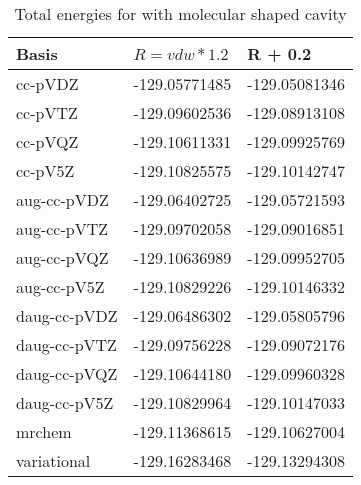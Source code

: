 \documentclass[../master_thesis.tex]{subfiles}
\begin{document}
\begin{table}[htbp]
\caption{Total energies for  with molecular shaped cavity}
\begin{tabular}{l|r|r}
Basis & \multicolumn{1}{l|}{$R = vdw*1.2$} & \multicolumn{1}{l|}{R + 0.2} \\ \hline
cc-pVDZ & -129.05771485 & -129.05081346 \\
cc-pVTZ & -129.09602536 & -129.08913108 \\
cc-pVQZ & -129.10611331 & -129.09925769 \\
cc-pV5Z & -129.10825575 & -129.10142747 \\ \hline
aug-cc-pVDZ & -129.06402725 & -129.05721593 \\
aug-cc-pVTZ & -129.09702058 & -129.09016851 \\
aug-cc-pVQZ & -129.10636989 & -129.09952705 \\
aug-cc-pV5Z & -129.10829226 & -129.10146332 \\ \hline
daug-cc-pVDZ & -129.06486302 & -129.05805796 \\
daug-cc-pVTZ & -129.09756228 & -129.09072176 \\
daug-cc-pVQZ & -129.10644180 & -129.09960328 \\
daug-cc-pV5Z & -129.10829964 & -129.10147033 \\ \hline
mrchem & -129.11368615 & -129.10627004 \\
variational & -129.16283468 & -129.13294308 \\
\end{tabular}
\label{tab:noprawdataabc}
\end{table}
\end{document}
